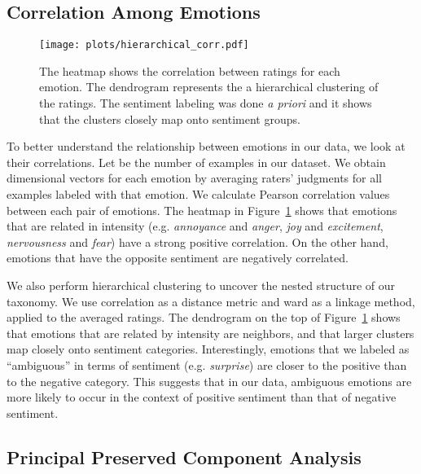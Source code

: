 \documentclass[11pt,a4paper]{article}
\begin{document}
\subsection{Correlation Among Emotions}
\begin{figure}[t!]
\centering
   \texttt{[image: plots/hierarchical\_corr.pdf]}
   \caption{The heatmap shows the correlation between ratings for each emotion. The dendrogram represents the a hierarchical clustering of the ratings. The sentiment labeling was done \emph{a priori} and it shows that the clusters closely map onto sentiment groups. }
   \label{fig:hierarchical_corr}
\end{figure}


To better understand the relationship between emotions in our data, we look at their correlations. Let  be the number of examples in our dataset. We obtain  dimensional vectors for each emotion by averaging raters' judgments for all examples labeled with that emotion. We calculate Pearson correlation values between each pair of emotions.  The heatmap in Figure~\ref{fig:hierarchical_corr} shows that emotions that are related in intensity (e.g. \emph{annoyance} and \emph{anger}, \emph{joy} and \emph{excitement}, \emph{nervousness} and \emph{fear}) have a strong positive correlation. On the other hand, emotions that have the opposite sentiment are negatively correlated.

We also perform hierarchical clustering to uncover the nested structure of our taxonomy. We use correlation as a distance metric and ward as a linkage method, applied to the averaged ratings. The dendrogram on the top of  Figure~\ref{fig:hierarchical_corr} shows that emotions that are related by intensity are neighbors, and that larger clusters map closely onto sentiment categories. Interestingly, emotions that we labeled as ``ambiguous'' in terms of sentiment (e.g. \emph{surprise}) are closer to the positive than to the negative category. This suggests that in our data, ambiguous emotions are more likely to occur in the context of positive sentiment than that of negative sentiment.


\subsection{Principal Preserved Component Analysis}
\label{ssec:ppca}
\end{document}
